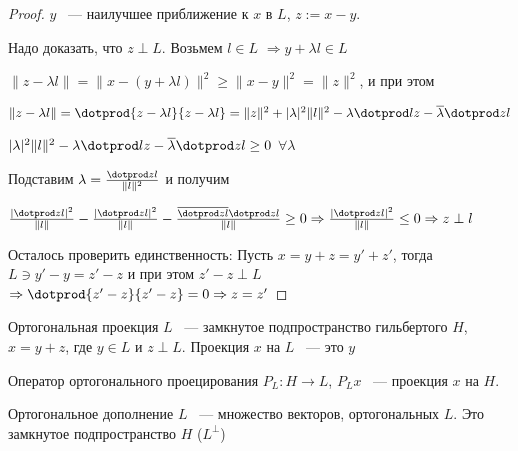    \begin{proof}
   $y$ ~--- наилучшее приближение к $x$ в $L$, $z := x - y$.
   
   Надо доказать, что $z\perp L$. Возьмем $l\in L$ $\Rightarrow y + \lambda l \in L$
   
   $\|z - \lambda l \| = \|x - (y + \lambda l)\|^2\ge \|x - y\|^2  = \|z\|^2$, и при этом
   
   $\|z - \lambda l \| = \dotprod{z - \lambda l}{z - \lambda l} = \|z\|^2 + |\lambda|^2\| l \|^2 - \lambda\dotprod lz
   - \overline{\lambda}\dotprod zl$
   
   $|\lambda|^2\| l \|^2 - \lambda \dotprod lz - \overline{\lambda} \dotprod zl
   \ge 0$ $\forall \lambda$
   
   Подставим $\lambda = \frac{\dotprod zl}{\| l \|^2}$ и получим 
   
   $\frac{|\dotprod zl|^2}{\| l \|} - \frac{|\dotprod zl|^2}{\| l \|}
   - \frac{\overline{\dotprod zl}\dotprod zl}{\| l \|} \ge 0
   \Rightarrow \frac{|\dotprod zl|^2}{\| l \|} \le 0 \Rightarrow z\perp l$
   
   Осталось проверить единственность: Пусть $x = y + z = y' + z'$, тогда
   $L \ni y' - y = z' - z$ и при этом $z' - z\perp L$ $\Rightarrow
   \dotprod{z' - z}{z' - z} = 0 \Rightarrow z = z'$
   
   \end{proof}
   
   \begin{definition}
   Ортогональная проекция $L$ ~--- замкнутое подпространство гильбертого $H$, $x = y + z$,
   где $y \in L$ и $z \perp L$. Проекция $x$ на $L$ ~--- это $y$
   \end{definition}
   
   \begin{definition}
   Оператор ортогонального проецирования $P_L : H \rightarrow L$, $P_L x $ ~--- проекция $x$
   на $H$.
   
   Ортогональное дополнение $L$ ~--- множество векторов, ортогональных $L$. Это замкнутое
   подпространство $H$ ($L^\perp$)
   \end{definition}
   
